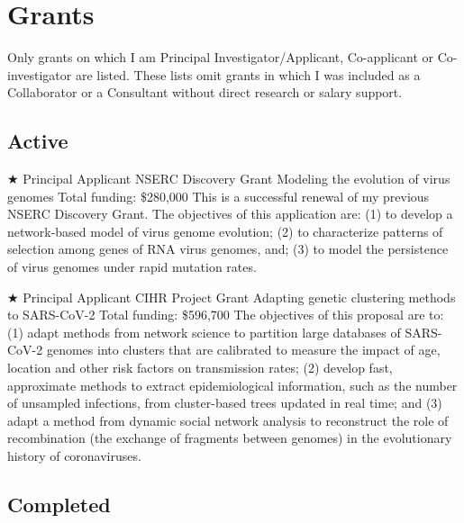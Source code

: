 
\section{Grants}

Only grants on which I am Principal Investigator/Applicant, Co-applicant or Co-investigator are listed.
These lists omit grants in which I was included as a Collaborator or a Consultant without direct research or salary support.


\subsection {Active}

{$\bigstar$ Principal Applicant}
{NSERC Discovery Grant}
{Modeling the evolution of virus genomes}
{Total funding: \$280,000}
{
This is a successful renewal of my previous NSERC Discovery Grant. 
The objectives of this application are: 
(1) to develop a network-based model of virus genome evolution;
(2) to characterize patterns of selection among genes of RNA virus genomes, and;
(3) to model the persistence of virus genomes under rapid mutation rates.\\
}


{$\bigstar$ Principal Applicant}
{CIHR Project Grant}  %
{Adapting genetic clustering methods to SARS-CoV-2}
{Total funding: \$596,700} %
{
The objectives of this proposal are to: (1) adapt methods from network science to partition large databases of SARS-CoV-2 genomes into clusters that are calibrated to measure the impact of age, location and other risk factors on transmission rates; (2) develop fast, approximate methods to extract epidemiological information, such as the number of unsampled infections, from cluster-based trees updated in real time; and (3) adapt a method from dynamic social network analysis to reconstruct the role of recombination (the exchange of fragments between genomes) in the evolutionary history of coronaviruses.\\
}




\vspace{1em}

\subsection {Completed}

